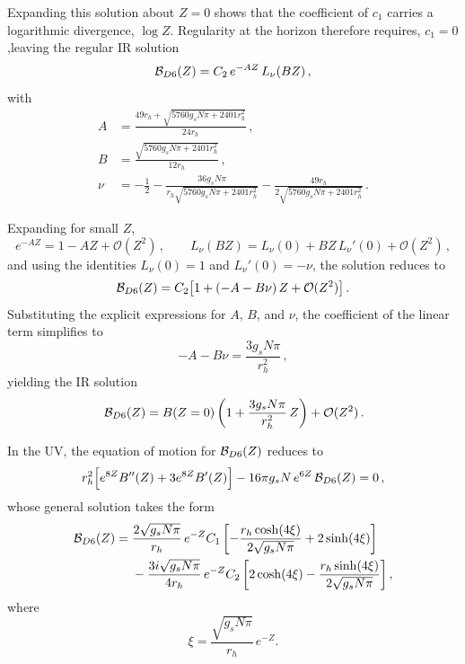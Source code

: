 \documentclass[a4paper,11pt,fleqn]{article}
\theoremstyle{plain}
\theoremstyle{definition}
\begin{document}
Expanding this solution about $Z=0$ shows that the coefficient of $c_1$ carries a logarithmic divergence, $\log Z$. Regularity at the horizon therefore requires, $c_1 = 0$,leaving the regular IR solution
\begin{equation}
{\cal B}_{D6}(Z) = C_2\, e^{-AZ}\, L_\nu(BZ) \, ,
\end{equation}
with
\begin{align}
A &= \frac{49 r_h + \sqrt{5760 g_sN\pi + 2401 r_h^2}}{24 r_h} \, , \\
B &= \frac{\sqrt{5760 g_sN\pi + 2401 r_h^2}}{12 r_h} \, , \\
\nu &= -\frac12 - \frac{36 g_sN\pi}{ r_h\sqrt{5760g_sN\pi+2401 r_h^2}} - \frac{49 r_h}{2\sqrt{5760g_sN\pi+2401 r_h^2}} \, .
\end{align}

Expanding for small $Z$,
\begin{equation}
e^{-AZ} = 1 - AZ + \mathcal{O}(Z^2) \, , \qquad
L_\nu(BZ) = L_\nu(0) + BZ\,L_\nu'(0) + \mathcal{O}(Z^2) \, ,
\end{equation}
and using the identities $L_\nu(0)=1$ and $L_\nu'(0)=-\nu$, the solution reduces to
\begin{equation}
{\cal B}_{D6}(Z) = C_2\big[1 + (-A - B\nu)\,Z + \mathcal{O}(Z^2)\big] \, .
\end{equation}
Substituting the explicit expressions for $A$, $B$, and $\nu$, the coefficient of the linear term simplifies to
\begin{equation}
-A - B\nu = \frac{3 g_sN\pi}{ r_h^2} \, ,
\end{equation}
yielding the IR solution
\begin{equation}
\,{\cal B}_{D6}(Z) = B(Z=0)\left(1 + \frac{3g_sN\pi}{ r_h^2}\,Z\right) + \mathcal{O}(Z^2)\, .
\end{equation}

In the UV, the equation of motion for ${\cal B}_{D6}(Z)$ reduces to
\begin{equation}
 r_h^{2}\Big[e^{8Z}B''(Z) + 3e^{8Z}B'(Z)\Big] - 16\pi g_s N\, e^{6Z}\,{\cal B}_{D6}(Z) = 0 \, ,
\end{equation}
whose general solution takes the form
\begin{equation}
\begin{aligned}
{\cal B}_{D6}(Z)=\;&
\frac{2\sqrt{g_sN\pi}}{r_h}\,e^{-Z}C_1
\left[
-\frac{r_h\cosh(4\xi)}{2\sqrt{g_sN\pi}}
+2\sinh(4\xi)
\right]\\
&-\frac{3i\sqrt{g_sN\pi}}{4r_h}\,e^{-Z}C_2
\left[
2\cosh(4\xi)
-\frac{r_h\sinh(4\xi)}{2\sqrt{g_sN\pi}}
\right],
\end{aligned}
\end{equation}
where
\begin{equation}
\xi=\frac{\sqrt{g_sN\pi}}{r_h}\,e^{-Z}.
\end{equation}
\end{document}
